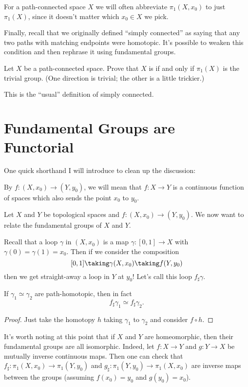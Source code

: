 \begin{abuse}
	For a path-connected space $X$ we will often abbreviate $\pi_1(X, x_0)$
	to just $\pi_1(X)$, since it doesn't matter which $x_0 \in X$
	we pick.
\end{abuse}

Finally, recall that we originally defined ``simply connected'' as saying
that any two paths with matching endpoints were homotopic.
It's possible to weaken this condition and then rephrase it using
fundamental groups.
\begin{exercise}
	Let $X$ be a path-connected space.
	Prove that $X$ is  if and only if
	$\pi_1(X)$ is the trivial group.
	(One direction is trivial; the other is a little trickier.)
\end{exercise}
This is the ``usual'' definition of simply connected.


\section{Fundamental Groups are Functorial}
One quick shorthand I will introduce to clean up the discussion:
\begin{definition}
	By $f : (X, x_0) \to (Y, y_0)$, we will mean that
	$f : X \to Y$ is a continuous function of spaces
	which also sends the point $x_0$ to $y_0$.
\end{definition}

Let $X$ and $Y$ be topological spaces and $f : (X, x_0) \to (Y, y_0)$.
We now want to relate the fundamental groups of $X$ and $Y$.

Recall that a loop $\gamma$ in $(X, x_0)$ is a map $\gamma : [0,1] \to X$
with $\gamma(0) = \gamma(1) = x_0$.
Then if we consider the composition
\[ [0,1] \taking\gamma (X, x_0) \taking f (Y, y_0) \]
then we get straight-away a loop in $Y$ at $y_0$!
Let's call this loop $f_\sharp \gamma$.
\begin{lemma}
	\label{lem:fsharp_homotopy_invariant}
	If $\gamma_1 \simeq \gamma_2$ are path-homotopic,
	then in fact
	\[ f_\sharp \gamma_1 \simeq f_\sharp \gamma_2. \]
\end{lemma}
\begin{proof}
	Just take the homotopy $h$ taking $\gamma_1$ to $\gamma_2$	
	and consider $f \circ h$.
\end{proof}

It's worth noting at this point that if $X$ and $Y$ are homeomorphic,
then their fundamental groups are all isomorphic.
Indeed, let $f : X \to Y$ and $g : Y \to X$ be mutually inverse continuous maps.
Then one can check that $f_\sharp : \pi_1(X, x_0) \to \pi_1(Y, y_0)$
and $g_\sharp : \pi_1(Y, y_0) \to \pi_1(X, x_0)$ are inverse maps
between the groups (assuming $f(x_0) = y_0$ and $g(y_0) = x_0$).

